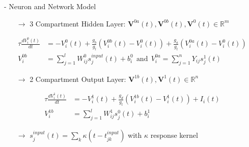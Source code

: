 \documentclass[dvipsnames, usenames]{beamer}
\newcommand{\R}{\mathbb{R}}
\begin{document}
\begin{frame}{\citet{guerguiev2017} - Neuron and Network Model}

\begin{itemize}
	\item[$\to$] 3 Compartment Hidden Layer: $\mathbf{V}^{0a}(t), \mathbf{V}^{0b}(t), \mathbf{V}^{0}(t) \in \R^m$
\end{itemize}	
	\begin{align*}
		\tau \frac{dV_i^0(t)}{dt} &= -V_i^0(t) + \frac{g_b}{g_l}\left(V_i^{0b}(t) - V_i^0(t)\right) +\frac{g_a}{g_l}\left(V_i^{0a}(t) - V_i^0(t)\right)\\
		V_i^{0b} &= \sum_{j=1}^l W_{ij}^0 s_j^{input}(t) + b_i^0 \ \ \text{and} \ \ V_i^{0a} = \sum_{j=1}^n Y_{ij} s^1_j(t)
	\end{align*}
\begin{itemize}
\pause
	\item[$\to$] 2 Compartment Output Layer: $\mathbf{V}^{1b}(t), \mathbf{V}^{1}(t) \in \R^n$
\end{itemize}
\begin{align*}
		\tau \frac{dV_i^1(t)}{dt} &= -V_i^1(t) + \frac{g_d}{g_l}\left(V_i^{1b}(t) - V_i^1(t) \right) + I_i(t)\\
		V_i^{1b} &= \sum_{j=1}^l W_{ij}^1 s_j^{0}(t) + b_i^1
\end{align*}
\begin{itemize}
	\item[$\to$] $s_j^{input}(t) = \sum_k \kappa(t-t_{jk}^{input})$ with $\kappa$ response kernel
	\end{itemize}
\end{frame}
\end{document}
